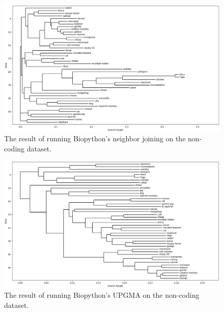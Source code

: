 \documentclass[11pt,twocolumn]{article}
\begin{document}
\begin{figure}
	\centering
	\includegraphics[width=0.95\linewidth]{img/nj_noncoding_biopython.png}
	\caption{The result of running Biopython's neighbor joining on the non-coding dataset.}
	\label{fig:nj_noncoding_bio}
\end{figure}
\begin{figure}
	\centering
	\includegraphics[width=0.95\linewidth]{img/upgma_noncoding_biopython.png}
	\caption{The result of running Biopython's UPGMA on the non-coding dataset.}
	\label{fig:upgma_noncoding_bio}
\end{figure}
\end{document}
